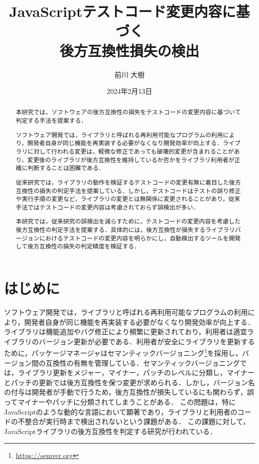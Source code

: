 \documentclass[11pt,dvipdfmx]{jreport}
\title{JavaScriptテストコード変更内容に基づく\\後方互換性損失の検出}
\author{前川 大樹}
\date{2024年2月13日}	%
\begin{document}
\maketitle

\begin{abstract}
本研究では，ソフトウェアの後方互換性の損失をテストコードの変更内容に基づいて判定する手法を提案する．

ソフトウェア開発では，ライブラリと呼ばれる再利用可能なプログラムの利用により，開発者自身が同じ機能を再実装する必要がなくなり開発効率が向上する．ライブラリに対して行われる変更は，軽微な修正であっても破壊的変更が含まれることがあり，変更後のライブラリが後方互換性を維持しているか否かをライブラリ利用者が正確に判断することは困難である．

従来研究では，ライブラリの動作を検証するテストコードの変更有無に着目した後方互換性の損失の判定手法を提案している．しかし，テストコードはテストの誤り修正や実行手順の変更など，ライブラリの変更とは無関係に変更されることがあり，従来手法ではテストコードの変更内容は考慮されておらず誤検出が多い．

本研究では，従来研究の誤検出を減らすために，テストコードの変更内容を考慮した後方互換性の判定手法を提案する．具体的には，後方互換性が損失するライブラリバージョンにおけるテストコードの変更内容を明らかにし，自動検出するツールを開発して後方互換性の損失の判定精度を検証する．

\end{abstract}

\tableofcontents



\newpage
{}	%



\chapter{はじめに}
ソフトウェア開発では，ライブラリと呼ばれる再利用可能なプログラムの利用により，開発者自身が同じ機能を再実装する必要がなくなり開発効率が向上する．ライブラリは機能追加やバグ修正により頻繁に更新されており，利用者は適宜ライブラリのバージョン更新が必要である．利用者が安全にライブラリを更新するために，パッケージマネージャはセマンティックバージョニング\footnote{\url{https://semver.org}}を採用し，バージョン間の互換性の有無を管理している．セマンティックバージョニングでは，ライブラリ更新をメジャー，マイナー，パッチのレベルに分類し，マイナーとパッチの更新では後方互換性を保つ変更が求められる．しかし，バージョン名の付与は開発者が手動で行うため，後方互換性が損失しているにも関わらず，誤ってマイナーやパッチに分類されてしまうことがある．
この問題は，特にJavaScriptのような動的な言語において顕著であり，ライブラリと利用者のコードの不整合が実行時まで検出されないという課題がある．
この課題に対して，JavaScriptライブラリの後方互換性を判定する研究が行われている．
\end{document}
